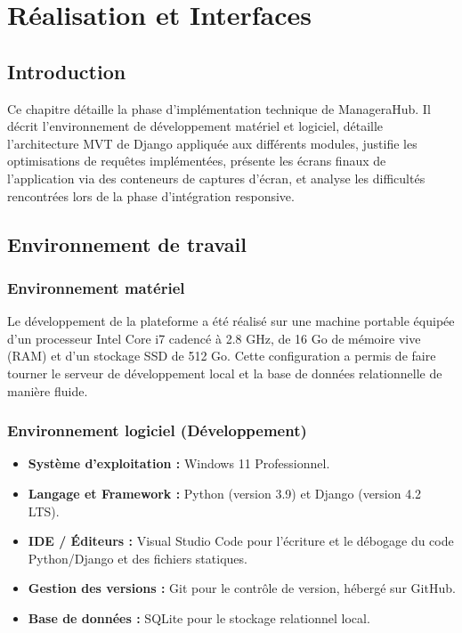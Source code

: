 \chapter{Réalisation et Interfaces}

\section{Introduction}
Ce chapitre détaille la phase d'implémentation technique de ManageraHub. Il décrit l'environnement de développement matériel et logiciel, détaille l'architecture MVT de Django appliquée aux différents modules, justifie les optimisations de requêtes implémentées, présente les écrans finaux de l'application via des conteneurs de captures d'écran, et analyse les difficultés rencontrées lors de la phase d'intégration responsive.

\section{Environnement de travail}
\subsection{Environnement matériel}
Le développement de la plateforme a été réalisé sur une machine portable équipée d'un processeur Intel Core i7 cadencé à 2.8 GHz, de 16 Go de mémoire vive (RAM) et d'un stockage SSD de 512 Go. Cette configuration a permis de faire tourner le serveur de développement local et la base de données relationnelle de manière fluide.

\subsection{Environnement logiciel (Développement)}
\begin{itemize}
    \item \textbf{Système d'exploitation :} Windows 11 Professionnel.
    \item \textbf{Langage et Framework :} Python (version 3.9) et Django (version 4.2 LTS).
    \item \textbf{IDE / Éditeurs :} Visual Studio Code pour l'écriture et le débogage du code Python\allowbreak/Django et des fichiers statiques.
    \item \textbf{Gestion des versions :} Git pour le contrôle de version, hébergé sur GitHub.
    \item \textbf{Base de données :} SQLite pour le stockage relationnel local.
\end{itemize}

